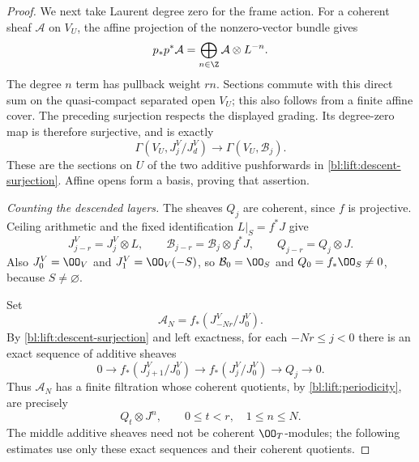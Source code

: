 \begin{proof}
We next take Laurent degree zero for the frame action.  For a coherent
sheaf \(\mathcal A\) on \(V_U\), the affine projection of the
nonzero-vector bundle gives
\begin{equation}\label{bl:lift:laurent-descent}
 p_*p^*\mathcal A
   =\bigoplus_{n\in\Z}\mathcal A\otimes L^{-n}.
\end{equation}
The degree \(n\) term has pullback weight \(rn\).  Sections commute
with this direct sum on the quasi-compact separated open \(V_U\);
this also follows from a finite affine cover.  The preceding
surjection respects the displayed grading.  Its degree-zero map is
therefore surjective, and is exactly
\[
 \Gamma(V_U,J_j^V/J_d^V)\longrightarrow
 \Gamma(V_U,\mathcal B_j).
\]
These are the sections on \(U\) of the two additive pushforwards in
\eqref{bl:lift:descent-surjection}.  Affine opens form a basis, proving
that assertion.

\smallskip\noindent
\emph{Counting the descended layers.}
The sheaves \(Q_j\) are coherent, since \(f\) is projective.
Ceiling arithmetic and the fixed identification \(L|_S=f^*J\) give
\begin{equation}\label{bl:lift:periodicity}
 J_{j-r}^V=J_j^V\otimes L,\qquad
 \mathcal B_{j-r}=\mathcal B_j\otimes f^*J,\qquad
 Q_{j-r}=Q_j\otimes J.
\end{equation}
Also \(J_0^V=\OO_V\) and \(J_1^V=\OO_V(-S)\), so
\(\mathcal B_0=\OO_S\) and \(Q_0=f_*\OO_S\ne0\), because
\(S\ne\varnothing\).

Set
\[
 \mathcal A_N=f_*(J_{-Nr}^V/J_0^V).
\]
By \eqref{bl:lift:descent-surjection} and left exactness, for each
\(-Nr\leq j<0\) there is an exact sequence of additive sheaves
\[
 0\longrightarrow f_*(J_{j+1}^V/J_0^V)
 \longrightarrow f_*(J_j^V/J_0^V)
 \longrightarrow Q_j\longrightarrow0.
\]
Thus \(\mathcal A_N\) has a finite filtration whose coherent
quotients, by \eqref{bl:lift:periodicity}, are precisely
\begin{equation}\label{bl:lift:positive-layers}
 Q_t\otimes J^n,\qquad 0\leq t<r,\quad 1\leq n\leq N.
\end{equation}
The middle additive sheaves need not be coherent \(\OO_T\)-modules;
the following estimates use only these exact sequences and their
coherent quotients.


\end{proof}
